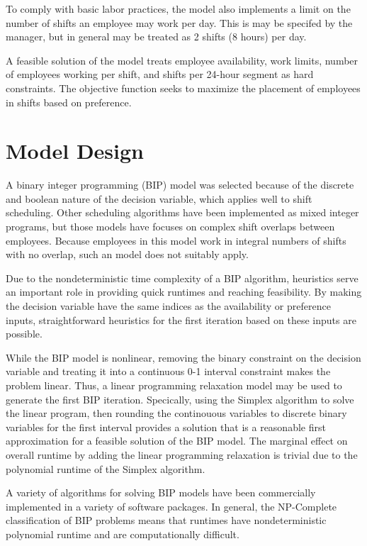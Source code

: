 To comply with basic labor practices, the model also implements a limit on the number of shifts an employee may work per day. This is may be specifed by the manager, but in general may be treated as 2 shifts (8 hours) per day. 

A feasible solution of the model treats employee availability, work limits, number of employees working per shift, and shifts per 24-hour segment as hard constraints. The objective function seeks to maximize the placement of employees in shifts based on preference.

\section{Model Design}

A binary integer programming (BIP) model was selected because of the discrete and boolean nature of the decision variable, which applies well to shift scheduling. Other scheduling algorithms have been implemented as mixed integer programs, but those models have focuses on complex shift overlaps between employees. Because employees in this model work in integral numbers of shifts with no overlap, such an model does not suitably apply.

Due to the nondeterministic time complexity of a BIP algorithm, heuristics serve an important role in providing quick runtimes and reaching feasibility. By making the decision variable have the same indices as the availability or preference inputs, straightforward heuristics for the first iteration based on these inputs are possible. 

While the BIP model is nonlinear, removing the binary constraint on the decision variable and treating it into a continuous 0-1 interval constraint makes the problem linear. Thus, a linear programming relaxation model may be used to generate the first BIP iteration. Specically, using the Simplex algorithm to solve the linear program, then rounding the continouous variables to discrete binary variables for the first interval provides a solution that is a reasonable first approximation for a feasible solution of the BIP model. The marginal effect on overall runtime by adding the linear programming relaxation is trivial due to the polynomial runtime of the Simplex algorithm.  

A variety of algorithms for solving BIP models have been commercially implemented in a variety of software packages. In general, the NP-Complete classification of BIP problems means that runtimes have nondeterministic polynomial runtime and are computationally difficult.

